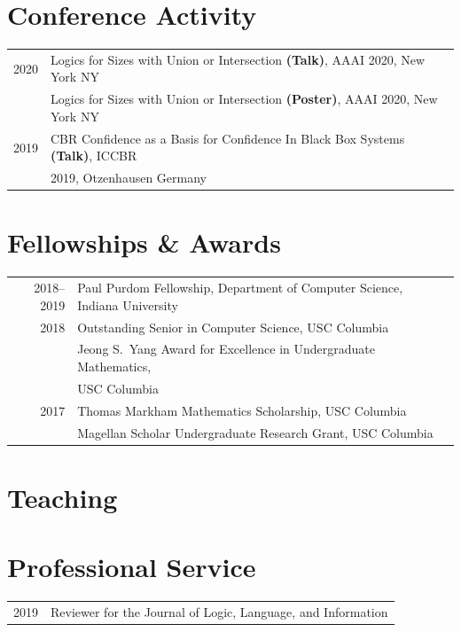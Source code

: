 \documentclass[12pt]{res} %
\begin{document}
\begin{resume}
\section{Conference Activity}
\vspace{5mm}
\begin{tabular}{rl}
    2020 & Logics for Sizes with Union or Intersection \textbf{(Talk)}, AAAI 2020, New York NY \\
        
         & Logics for Sizes with Union or Intersection \textbf{(Poster)}, AAAI 2020, New York NY \\

    2019 & CBR Confidence as a Basis for Confidence In Black Box Systems \textbf{(Talk)}, ICCBR\\[-4pt]
         & 2019, Otzenhausen Germany
\end{tabular}


\section{Fellowships \& Awards}
\vspace{5mm}
\begin{tabular}{rl}
2018--2019 & Paul Purdom Fellowship, Department of Computer Science, Indiana University\\
    2018 & Outstanding Senior in Computer Science, USC Columbia\\
         & Jeong S.\ Yang Award for Excellence in Undergraduate Mathematics,\\[-4pt]
         & \quad USC Columbia\\
    2017 & Thomas Markham Mathematics Scholarship, USC Columbia \\
         & Magellan Scholar Undergraduate Research Grant, USC Columbia
\end{tabular}

\section{Teaching}

\section{Professional Service}
\vspace{5mm}
\begin{tabular}{rl}
    2019 & Reviewer for the Journal of Logic, Language, and Information\\
\end{tabular}


\end{resume}
\end{document}
